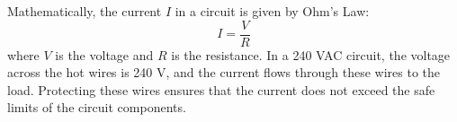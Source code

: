 Mathematically, the current \( I \) in a circuit is given by Ohm's Law:
\[
I = \frac{V}{R}
\]
where \( V \) is the voltage and \( R \) is the resistance. In a 240 VAC circuit, the voltage across the hot wires is 240 V, and the current flows through these wires to the load. Protecting these wires ensures that the current does not exceed the safe limits of the circuit components.

